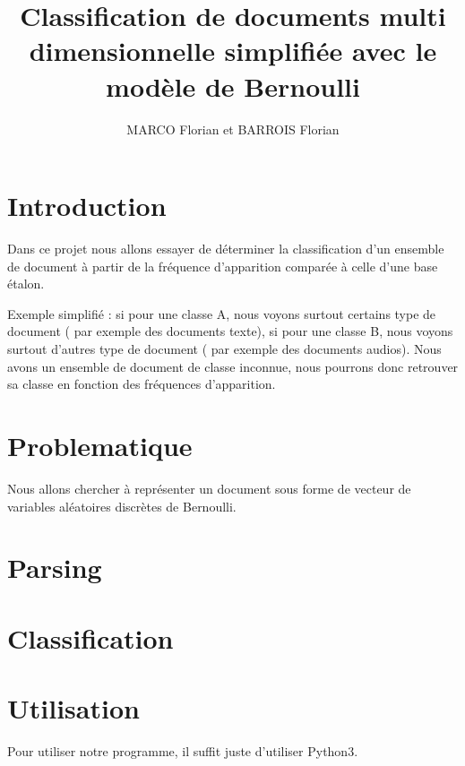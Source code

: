\documentclass[a4paper,11pt]{article}
\title{Classification de documents multi dimensionnelle simplifiée avec le modèle de Bernoulli}
\author{MARCO Florian et BARROIS Florian}
\date{}
\begin{document}
\maketitle

\section{Introduction}

Dans ce projet nous allons essayer de déterminer la classification d'un ensemble de document à partir de la fréquence d'apparition comparée à celle d'une base étalon.

Exemple simplifié : si pour une classe A, nous voyons surtout certains type de document ( par exemple des documents texte), si pour une classe B, nous voyons surtout d'autres type de document ( par exemple des documents audios). 
Nous avons un ensemble de document de classe inconnue, nous pourrons donc retrouver sa classe en fonction des fréquences d'apparition.

\section{Problematique}

Nous allons chercher à représenter un document sous forme de vecteur de variables aléatoires discrètes de Bernoulli. 

\section{Parsing}

\section{Classification}

\section{Utilisation}

Pour utiliser notre programme, il suffit juste d'utiliser Python3.
\end{document}
